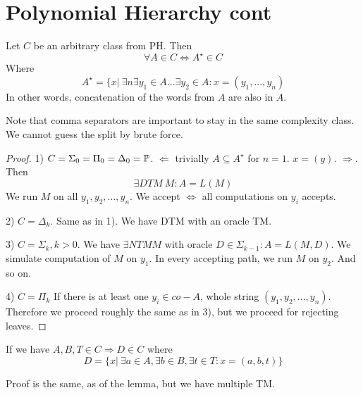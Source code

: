 \section{\texorpdfstring{Polynomial Hierarchy cont}{Polynomial Hierarchy cont}}
\vspace{5mm}
\large

\begin{lemma}
	Let $C$ be an arbitrary class from PH.
	Then
	\[ \forall A \in C \iff A^{\star} \in C \]
	Where
	\[ A^{\star} = \{ x |\ \exists n \exists y_1 \in A ... \exists y_2 \in A: x = (y_1, ..., y_n) \]
	In other words, concatenation of the words from $A$ are also in $A$.

	Note that comma separators are important to stay in the same complexity class.
	We cannot guess the split by brute force.
\end{lemma}
\begin{proof}
	1) $C = \Sigma_0 = \Pi_0 = \Delta_0 = \operatorname{\mathbb{P}}$.
	$\Leftarrow$ trivially $A \subseteq A^{\star}$ for $n = 1$.
	$x = (y)$.
	$\Rightarrow$. Then
	\[ \exists DTM\ M: A = L(M)\]
	We run $M$ on all $y_1, y_2, ..., y_n$.
	We accept $\iff$ all computations on $y_i$ accepts.

	2) $C = \Delta_k$.
	Same as in 1). We have DTM with an oracle TM.

	3) $C = \Sigma_k, k > 0$.
	We have
	$ \exists NTM M$ with oracle $D \in \Sigma_{k - 1}: A = L(M, D)$.
	We simulate computation of $M$ on $y_1$.
	In every accepting path, we run $M$ on $y_2$. And so on.

	4) $C = \Pi_k$
	If there is at least one $y_i \in co-A$, whole string $(y_1, y_2, ..., y_n)$.
	Therefore we proceed roughly the same as in 3), but we proceed for rejecting leaves.
\end{proof}

\begin{consequence}
	If we have $A,B,T \in C \Rightarrow D \in C$ where
	\[ D = \{ x |\ \exists a \in A, \exists b \in B, \exists t \in T: x = (a, b, t) \} \]

	Proof is the same, as of the lemma, but we have multiple TM.
\end{consequence}

